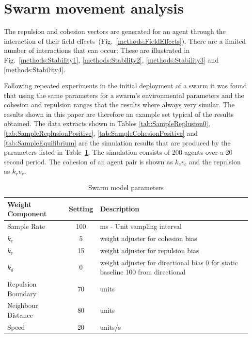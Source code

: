 \documentclass{ieeeaccess}
\begin{document}
\section{Swarm movement analysis\label{metric:MagnitudeDynamics2}}
The repulsion and cohesion vectors are generated for an agent through the interaction of their field effects~(Fig.~\ref{methods:FieldEffects}). There are a limited number of interactions that can occur; These are illustrated in Fig.~\ref{methods:Stability1}, \ref{methods:Stability2}, \ref{methods:Stability3} and \ref{methods:Stability4}.

Following repeated experiments in the initial deployment of a swarm it was found that using the same parameters for a swarm's environmental parameters and the cohesion and repulsion ranges that the results where always very similar. The results shown in this paper are therefore an example set typical of the results obtained. The data extracts shown in Tables \ref{tab:SampleReplusion0}, \ref{tab:SampleReplusionPositive}, \ref{tab:SampleCohesionPositive} and  \ref{tab:SampleEquilibrium} are the simulation results that are produced by the parameters listed in Table~\ref{tab:MetricPhysics1}. The simulation consists of 200 agents over a 20 second period. The cohesion of an agent pair is shown as $k_cv_c$ and the repulsion as $k_rv_r$.

\begin{table}[H]
\begin{center}
\begin{tabular}{| p{2.5cm} | c | p{3cm} |}
\hline
\bf Weight \bf Component & \bf Setting & \bf Description \\ \hline
Sample Rate & 100 & ms - Unit sampling interval\\  \hline
$k_c$ & 5 & weight adjuster for cohesion bias\\  \hline
$k_r$ & 15 & weight adjuster for repulsion  bias\\  \hline
$k_d$ & 0 & weight adjuster for directional bias 0 for static baseline 100 from directional\\  \hline
Repulsion Boundary & 70 & units\\  \hline
Neighbour Distance & 80 & units\\  \hline
Speed & 20 & units/s\\  \hline
\end{tabular}\caption{Swarm model parameters} \label{tab:MetricPhysics1}
\end{center}
\end{table}
\end{document}
